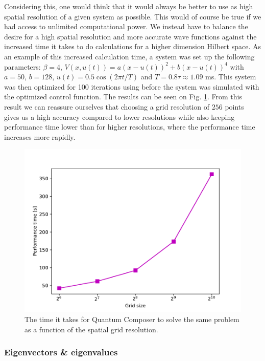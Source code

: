 \documentclass[a4paper, twocolumn]{revtex4-1}
\begin{document}
Considering this, one would think that it would always be better to use as high spatial resolution of a given system as possible. This would of course be true if we had access to unlimited computational power. We instead have to balance the desire for a high spatial resolution and more accurate wave functions against the increased time it takes to do calculations for a higher dimension Hilbert space. As an example of this increased calculation time, a system was set up the following parameters: $\beta = 4$, $V(x,u(t)) = a(x-u(t))^2 + b(x-u(t))^4$ with $a=50$, $b=128$, $u(t)=0.5 \cos(2\pi t/T)$ and $T=0.8 \tau \approx 1.09$ ms. This system was then optimized for 100 iterations using  before the system was simulated with the optimized control function. The results can be seen on Fig. \ref{fig:performanceTime}. From this result we can reassure ourselves that choosing a grid resolution of $256$ points gives us a high accuracy compared to lower resolutions while also keeping performance time lower than for higher resolutions, where the performance time increases more rapidly.

\begin{figure}
	\includegraphics[width=\columnwidth]{graphics/stateAnalysis/PerformanceTime.pdf}
	\caption{The time it takes for Quantum Composer to solve the same problem as a function of the spatial grid resolution.}
	\label{fig:performanceTime}
\end{figure}

\subsubsection{Eigenvectors \& eigenvalues}
\end{document}
